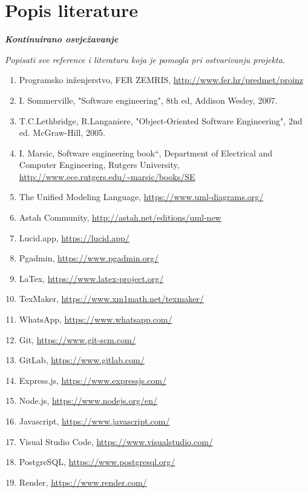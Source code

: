 \chapter*{Popis literature}
	 	
 		\textbf{\textit{Kontinuirano osvježavanje}}
	
		\textit{Popisati sve reference i literaturu koja je pomogla pri ostvarivanju projekta.}
		
		
		\begin{enumerate}
			
			
			\item  Programsko inženjerstvo, FER ZEMRIS, \url{http://www.fer.hr/predmet/proinz}
			
			\item  I. Sommerville, "Software engineering", 8th ed, Addison Wesley, 2007.
			
			\item  T.C.Lethbridge, R.Langaniere, "Object-Oriented Software Engineering", 2nd ed. McGraw-Hill, 2005.
			
			\item  I. Marsic, Software engineering book``, Department of Electrical and Computer Engineering, Rutgers University, \url{http://www.ece.rutgers.edu/~marsic/books/SE}
			
			\item  The Unified Modeling Language, \url{https://www.uml-diagrams.org/}
			
			\item  Astah Community, \url{http://astah.net/editions/uml-new}
			\item Lucid.app, \url{https://lucid.app/}
			\item Pgadmin, \url{https://www.pgadmin.org/}
			\item LaTex, \url{https://www.latex-project.org/}
			\item TexMaker, \url{https://www.xm1math.net/texmaker/}
			\item WhatsApp, \url{https://www.whatsapp.com/}
			\item Git, \url{https://www.git-scm.com/}
			\item GitLab, \url{https://www.gitlab.com/}
			\item Express.js, \url{https://www.expressjs.com/}
			\item Node.js, \url{https://www.nodejs.org/en/}
			\item Javascript, \url{https://www.javascript.com/}
			\item Visual Studio Code, \url{https://www.visualstudio.com/}
			\item PostgreSQL, \url{https://www.postgresql.org/}
			\item Render, \url{https://www.render.com/}
		\end{enumerate}
		
		
		 
